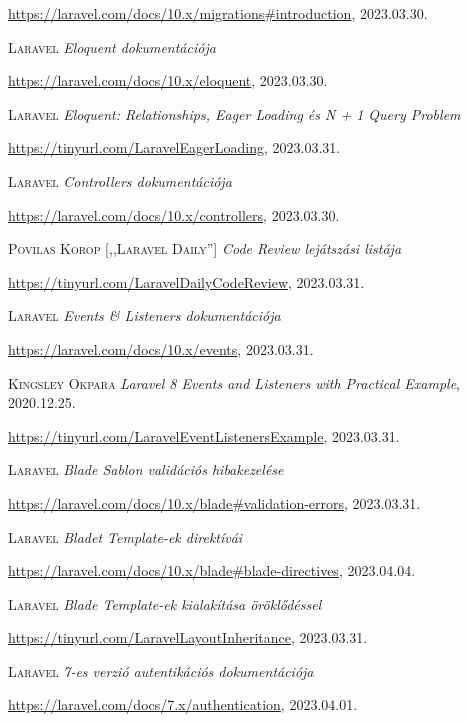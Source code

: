 \documentclass[
]{thesis-ekf}
\theoremstyle{definition}
\theoremstyle{remark}
\begin{document}
\begin{thebibliography}{2}
		\url{https://laravel.com/docs/10.x/migrations#introduction}, 2023.03.30.

		\textsc{Laravel} \emph{Eloquent dokumentációja}
		
		\url{https://laravel.com/docs/10.x/eloquent}, 2023.03.30.

		\textsc{Laravel} \emph{Eloquent: Relationships, Eager Loading és N + 1 Query Problem}
		
		\url{https://tinyurl.com/LaravelEagerLoading}, 2023.03.31.

		\textsc{Laravel} \emph{Controllers dokumentációja}
		
		\url{https://laravel.com/docs/10.x/controllers}, 2023.03.30.

		\textsc{Povilas Korop [,,Laravel Daily'']} \emph{Code Review lejátszási listája}
		
		\url{https://tinyurl.com/LaravelDailyCodeReview}, 2023.03.31.

		\textsc{Laravel} \emph{ Events \& Listeners dokumentációja}
		
		\url{ https://laravel.com/docs/10.x/events}, 2023.03.31.
           
		\textsc{Kingsley Okpara} \emph{Laravel 8 Events and Listeners with Practical Example}, 2020.12.25.
		
		\url{https://tinyurl.com/LaravelEventListenersExample}, 2023.03.31.


		\textsc{Laravel} \emph{Blade Sablon validációs hibakezelése}
		
		  \url{ https://laravel.com/docs/10.x/blade#validation-errors}, 2023.03.31.

		\textsc{Laravel} \emph{Bladet Template-ek direktívái}
		
		\url{ https://laravel.com/docs/10.x/blade#blade-directives}, 2023.04.04.

		\textsc{Laravel} \emph{Blade Template-ek kialakítása öröklődéssel}
		
		\url{https://tinyurl.com/LaravelLayoutInheritance}, 2023.03.31.

		\textsc{Laravel} \emph{7-es verzió autentikációs dokumentációja}
		
		\url{  https://laravel.com/docs/7.x/authentication}, 2023.04.01.


\end{thebibliography}
\end{document}
